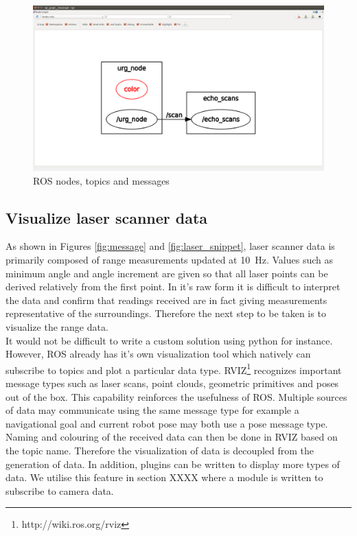 \documentclass[capstone_report.tex]{subfiles}
\begin{document}
\begin{figure}[H]
    \centering
    \includegraphics[width=0.8\linewidth]{imgs/node_graph.png}
    \caption{ROS nodes, topics and messages}
    \label{fig:ROS}
\end{figure}

\subsection{Visualize laser scanner data}

As shown in Figures \ref{fig:message} and \ref{fig:laser_snippet}, laser scanner data is primarily composed of range measurements updated at \SI{10}{\hertz}.  Values such as minimum angle and angle increment are given so that all laser points can be derived relatively from the first point.  In it’s raw form it is difficult to interpret the data and confirm that readings received are in fact giving measurements representative of the surroundings.  Therefore the next step to be taken is to visualize the range data.\\

It would not be difficult to write a custom solution using python for instance.  However, ROS already has it’s own visualization tool which natively can subscribe to topics and plot a particular data type.  RVIZ\footnote{http://wiki.ros.org/rviz} recognizes important message types such as laser scans, point clouds, geometric primitives and poses out of the box.  This capability reinforces the usefulness of ROS.  Multiple sources of data may communicate using the same message type for example a navigational goal and current robot pose may both use a pose message type.  Naming and colouring of the received data can then be done in RVIZ based on the topic name.  Therefore the visualization of data is decoupled from the generation of data.  In addition, plugins can be written to display more types of data.  We utilise this feature in section XXXX where a module is written to subscribe to camera data.\\
\end{document}
